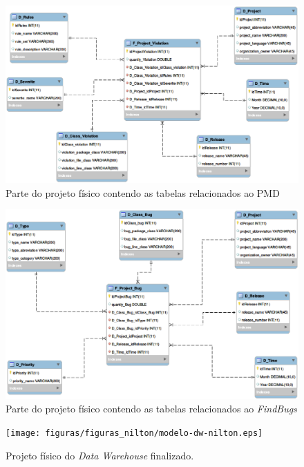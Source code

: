 \begin{figure}[h!]
\centering
\includegraphics[keepaspectratio=false,scale=0.50]{figuras/figuras_nilton/project_violation.eps}
\caption{Parte do projeto físico contendo as tabelas relacionados ao PMD}
\label{fig:project_violation}
\end{figure}
\FloatBarrier

\begin{figure}[h!]
\centering
\includegraphics[keepaspectratio=false,scale=0.50]{figuras/figuras_nilton/project_bug.eps}
\caption{Parte do projeto físico contendo as tabelas relacionados ao \textit{FindBugs}}
\label{fig:project_bug}
\end{figure}
\FloatBarrier

\begin{figure}[h!]
\centering
\texttt{[image: figuras/figuras\_nilton/modelo-dw-nilton.eps]}
\caption{Projeto físico do \textit{Data Warehouse} finalizado.}
\label{fig:arquitetura_solucao_finalizado}
\end{figure}
\FloatBarrier

